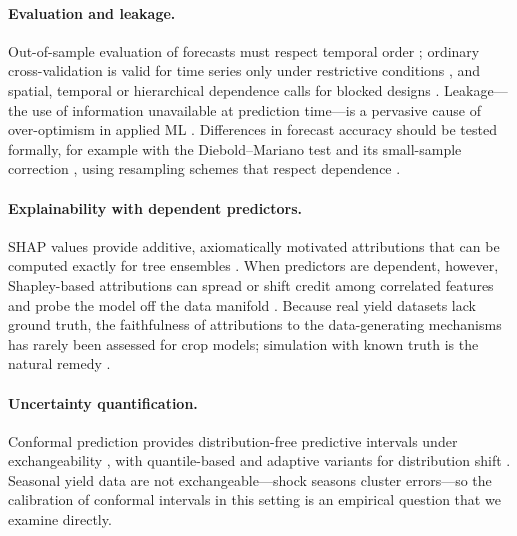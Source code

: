\paragraph{Evaluation and leakage.}
Out-of-sample evaluation of forecasts must respect temporal order \citep{tashman2000out,hyndman2021forecasting}; ordinary cross-validation is valid for time series only under restrictive conditions \citep{bergmeir2012use}, and spatial, temporal or hierarchical dependence calls for blocked designs \citep{roberts2017cross}. Leakage---the use of information unavailable at prediction time---is a pervasive cause of over-optimism in applied ML \citep{kaufman2012leakage,kapoor2023leakage}. Differences in forecast accuracy should be tested formally, for example with the Diebold--Mariano test \citep{diebold1995comparing} and its small-sample correction \citep{harvey1997testing}, using resampling schemes that respect dependence \citep{kunsch1989jackknife,efron1993introduction}.

\paragraph{Explainability with dependent predictors.}
SHAP values provide additive, axiomatically motivated attributions \citep{lundberg2017unified} that can be computed exactly for tree ensembles \citep{lundberg2020local}. When predictors are dependent, however, Shapley-based attributions can spread or shift credit among correlated features and probe the model off the data manifold \citep{aas2021explaining,hooker2021unrestricted,molnar2022interpretable}. Because real yield datasets lack ground truth, the faithfulness of attributions to the data-generating mechanisms has rarely been assessed for crop models; simulation with known truth is the natural remedy \citep{morris2019using}.

\paragraph{Uncertainty quantification.}
Conformal prediction provides distribution-free predictive intervals under exchangeability \citep{vovk2005algorithmic,lei2018distribution}, with quantile-based \citep{romano2019conformalized} and adaptive variants for distribution shift \citep{gibbs2021adaptive}. Seasonal yield data are not exchangeable---shock seasons cluster errors---so the calibration of conformal intervals in this setting is an empirical question that we examine directly.
